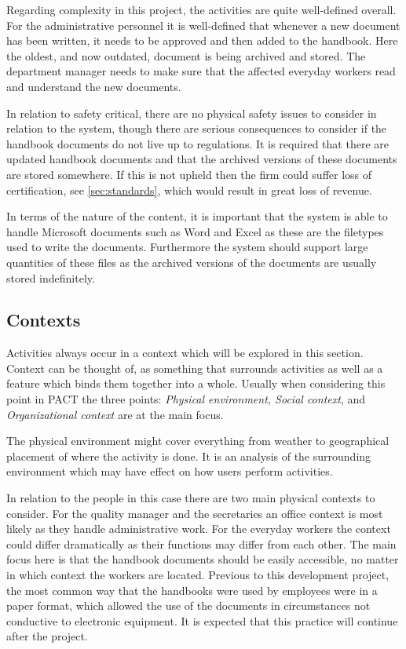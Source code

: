 Regarding complexity in this project, the activities are quite well-defined overall.
For the administrative personnel it is well-defined that whenever a new document has been written, it needs to be approved and then added to the handbook.
Here the oldest, and now outdated, document is being archived and stored.
The department manager needs to make sure that the affected everyday workers read and understand the new documents.

In relation to safety critical, there are no physical safety issues to consider in relation to the system, though there are serious consequences to consider if the handbook documents do not live up to regulations.
It is required that there are updated handbook documents and that the archived versions of these documents are stored somewhere.
If this is not upheld then the firm could suffer loss of certification, see \cref{sec:standards}, which would result in great loss of revenue.

In terms of the nature of the content, it is important that the system is able to handle Microsoft documents such as Word and Excel as these are the filetypes used to write the documents.
Furthermore the system should support large quantities of these files as the archived versions of the documents are usually stored indefinitely.

\subsection{Contexts}
Activities always occur in a context which will be explored in this section.
Context can be thought of, as something that surrounds activities as well as a feature which binds them together into a whole.
Usually when considering this point in PACT the three points: \textit{Physical environment, Social context}, and \textit{Organizational context} are at the main focus.

The physical environment might cover everything from weather to geographical placement of where the activity is done.
It is an analysis of the surrounding environment which may have effect on how users perform activities.

In relation to the people in this case there are two main physical contexts to consider.
For the quality manager and the secretaries an office context is most likely as they handle administrative work.
For the everyday workers the context could differ dramatically as their functions may differ from each other.
The main focus here is that the handbook documents should be easily accessible, no matter in which context the workers are located.
Previous to this development project, the most common way that the handbooks were used by employees were in a paper format, which allowed the use of the documents in circumstances not conductive to electronic equipment.
It is expected that this practice will continue after the project.

